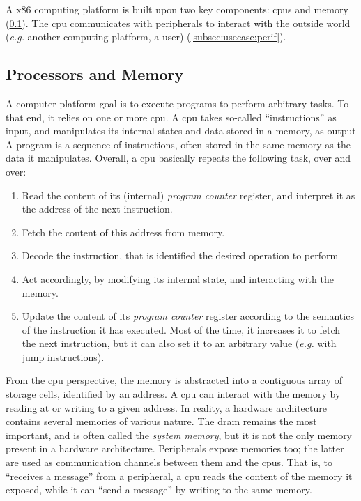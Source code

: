 A x86 computing platform is built upon two key components: \acp{cpu} and memory
(\ref{subsec:usecase:cpumem}).
%
The \ac{cpu} communicates with peripherals to interact with the outside world
(\emph{e.g.} another computing platform, a user) (\ref{subsec:usecase:perif}).

\subsection{Processors and Memory}
\label{subsec:usecase:cpumem}

A computer platform goal is to execute programs to perform arbitrary tasks.
%
To that end, it relies on one or more \ac{cpu}.
%
A \ac{cpu} takes so-called ``instructions'' as input, and manipulates its
internal states and data stored in a memory, as output
%
A program is a sequence of instructions, often stored in the same memory as the
data it manipulates.
%
Overall, a \ac{cpu} basically repeats the following task, over and over:

\begin{enumerate}
\item Read the content of its (internal) \emph{program counter} register, and
  interpret it as the address of the next instruction.
%
\item Fetch the content of this address from memory.
%
\item Decode the instruction, that is identified the desired operation to
  perform
%
\item Act accordingly, by modifying its internal state, and interacting with the
  memory.
%
\item Update the content of its \emph{program counter} register according to the
  semantics of the instruction it has executed. Most of the time, it increases
  it to fetch the next instruction, but it can also set it to an arbitrary value
  (\emph{e.g.} with jump instructions).
\end{enumerate}

From the \ac{cpu} perspective, the memory is abstracted into a contiguous array
of storage cells, identified by an address.
%
A \ac{cpu} can interact with the memory by reading at or writing to a given
address.
%
In reality, a hardware architecture contains several memories of various nature.
%
The \ac{dram} remains the most important, and is often called the \emph{system
  memory}, but it is not the only memory present in a hardware architecture.
%
Peripherals expose memories too; the latter are used as communication channels
between them and the \acp{cpu}.
%
That is, to ``receives a message'' from a peripheral, a \ac{cpu} reads the
content of the memory it exposed, while it can ``send a message'' by writing to
the same memory.


